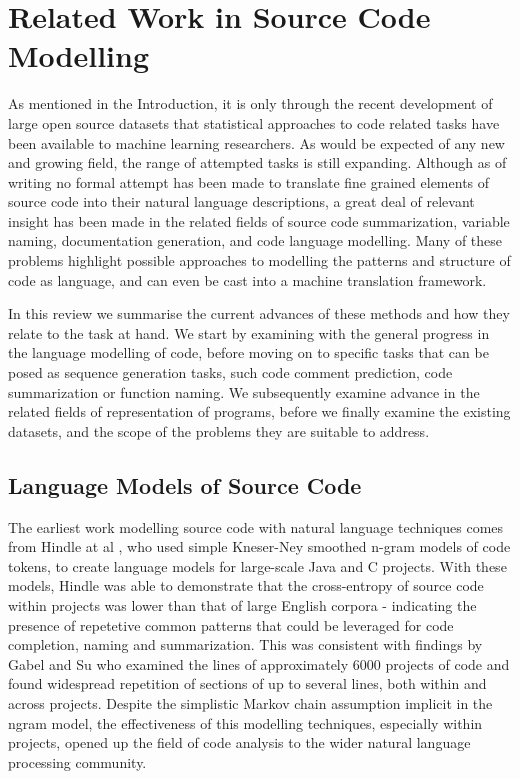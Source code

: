 \blindtext

\section{Related Work in Source Code Modelling}

As mentioned in the Introduction, it is only through the recent development of large open source datasets that statistical approaches to code related tasks have been available to machine learning researchers. 
As would be expected of any new and growing field, the range of attempted tasks is still expanding. 
Although as of writing no formal attempt has been made to translate fine grained elements of source code into their natural language descriptions, a great deal of relevant insight has been made in the related fields of source code summarization, variable naming, documentation generation, and code language modelling. Many of these problems highlight possible approaches to modelling the patterns and structure of code as language, and can even be cast into a machine translation framework.  

In this review we summarise the current advances of these methods and how they relate to the task at hand.  We start by examining with the general progress in the language modelling of code, before moving on to specific tasks that can be posed as sequence generation tasks, such code comment prediction, code summarization or function naming. We subsequently examine advance in the related fields of representation of programs, before we finally examine the existing datasets, and the scope of the problems they are suitable to address. 

\subsection{Language Models of Source Code}

The earliest work modelling source code with natural language techniques comes from Hindle at al \cite{hindle_naturalness_nodate}, who used simple Kneser-Ney smoothed n-gram models of code tokens, to create language models for large-scale Java and C projects.
With these models, Hindle was able to demonstrate that the cross-entropy of source code within projects was lower than that of large English corpora - indicating the presence of repetetive common patterns that could be leveraged for code completion, naming and summarization.
This was consistent with findings by Gabel and Su \cite{gabel_study_2010} who examined the lines of approximately 6000 projects of code and found widespread repetition of sections of up to several lines, both within and across projects.
Despite the simplistic Markov chain assumption implicit in the ngram model, the effectiveness of this modelling techniques, especially within projects, opened up the field of code analysis to the wider natural language processing community.

